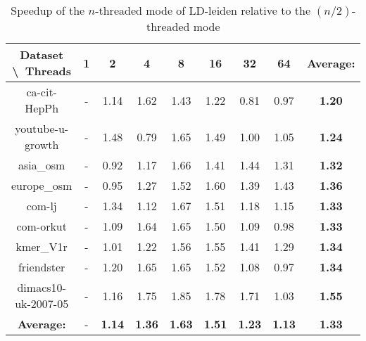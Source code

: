 \begin{table}[H]
	\centering
	\begin{tabular}{|c|c|c|c|c|c|c|c|c|}
		\hline
		Dataset \textbackslash\ Threads& 1 & 2 & 4 & 8 & 16 & 32 & 64 & \textbf{Average:} \\
		\hline
		ca-cit-HepPh & - & 1.14 & 1.62 & 1.43 & 1.22 & 0.81 & 0.97 & \textbf{1.20} \\
		\hline
		youtube-u-growth & - & 1.48 & 0.79 & 1.65 & 1.49 & 1.00 & 1.05 & \textbf{1.24} \\
		\hline
		asia\_osm & - & 0.92 & 1.17 & 1.66 & 1.41 & 1.44 & 1.31 & \textbf{1.32} \\
		\hline
		europe\_osm & - & 0.95 & 1.27 & 1.52 & 1.60 & 1.39 & 1.43 & \textbf{1.36} \\
		\hline
		com-lj & - & 1.34 & 1.12 & 1.67 & 1.51 & 1.18 & 1.15 & \textbf{1.33} \\
		\hline
		com-orkut & - & 1.09 & 1.64 & 1.65 & 1.50 & 1.09 & 0.98 & \textbf{1.33} \\
		\hline
		kmer\_V1r & - & 1.01 & 1.22 & 1.56 & 1.55 & 1.41 & 1.29 & \textbf{1.34} \\
		\hline
		friendster & - & 1.20 & 1.65 & 1.65 & 1.52 & 1.08 & 0.97 & \textbf{1.34} \\
		\hline
		dimacs10-uk-2007-05 & - & 1.16 & 1.75 & 1.85 & 1.78 & 1.71 & 1.03 & \textbf{1.55} \\
		\hline
		\textbf{Average:} & - & \textbf{1.14} & \textbf{1.36} & \textbf{1.63} & \textbf{1.51} & \textbf{1.23} & \textbf{1.13} & \textbf{1.33} \\
		\hline
	\end{tabular}
\caption{Speedup of the $n$-threaded mode of LD-leiden relative to the $(n/2)$-threaded mode}
\label{T:relative speedup for LD-leiden}
\end{table}